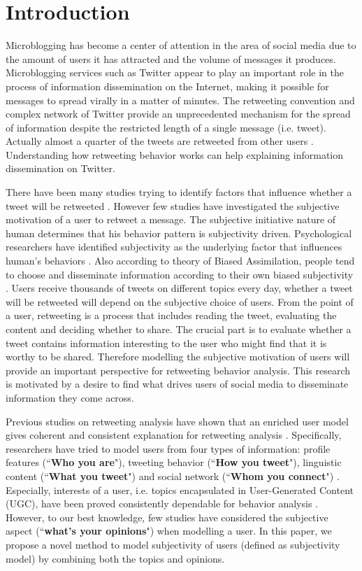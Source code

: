 \documentclass[letterpaper]{article}
\begin{document}
\section{Introduction}
\label{introduction}
\noindent Microblogging has become a center of attention in the area of social media due to the amount of users it has attracted and the volume of messages it produces. 
Microblogging services such as Twitter appear to play an important role in the process of information dissemination on the Internet, making it possible for messages to spread virally in a matter of minutes. 
The retweeting convention and complex network of Twitter provide an unprecedented mechanism for the spread of information despite the restricted length of a single message (i.e. tweet). 
Actually almost a quarter of the tweets are retweeted from other users \cite{yang2010understanding}. 
Understanding how retweeting behavior works can help explaining information dissemination on Twitter. 

There have been many studies trying to identify factors that influence whether a tweet will be retweeted \cite{boyd2010tweet,kwak2010twitter}. However few studies have investigated the subjective motivation of a user to retweet a message. 
The subjective initiative nature of human determines that his behavior pattern is subjectivity driven. Psychological researchers have identified subjectivity as the underlying factor that influences human's behaviors \cite{moore2008awareness}. 
Also according to theory of Biased Assimilation, people tend to choose and disseminate information according to their own biased subjectivity \cite{Hyman2000}. 
Users receive thousands of tweets on different topics every day, whether a tweet will be retweeted will depend on the subjective choice of users. 
From the point of a user, retweeting is a process that includes reading the tweet, evaluating the content and deciding whether to share. The crucial part is to evaluate whether a tweet contains information interesting to the user who might find that it is worthy to be shared.  
Therefore modelling the subjective motivation of users will provide an important perspective for retweeting behavior analysis. 
This research is motivated by a desire to find what drives users of social media to disseminate information they come across. 

Previous studies on retweeting analysis have shown that an enriched user model gives coherent and consistent explanation for retweeting analysis \cite{macskassy2011people,feng2013retweet}. 
Specifically, researchers have tried to model users from four types of information:
profile features (``\textbf{Who you are}"), tweeting behavior (``\textbf{How you tweet}"), linguistic content (``\textbf{What you tweet}") and social network (``\textbf{Whom you connect}") \cite{pennacchiotti2011machine}. 
Especially, interests of a user, i.e. topics encapsulated in User-Generated Content (UGC), have been proved consistently dependable for behavior analysis \cite{petrovic2011rt}. 
However, to our best knowledge, few studies have considered the subjective aspect (``\textbf{what's your opinions}") when modelling a user. 
In this paper, we propose a novel method to model subjectivity of users (defined as subjectivity model) by combining both the topics and opinions. 
\end{document}
